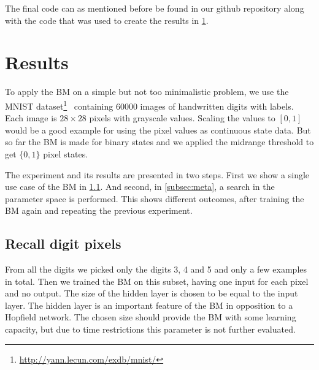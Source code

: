 \documentclass[12pt,twoside]{article}
\theoremstyle{plain}
\theoremstyle{definition}
\theoremstyle{remark}
\begin{document}
\noindent
The final code can as mentioned before be found in our github repository along
with the code that was used to create the results in \cref{sec:results}.


%
%
%
%
%
%
%


\section{Results}
\label{sec:results}

To apply the BM on a simple but not too minimalistic problem, we use the MNIST dataset\footnote{\url{http://yann.lecun.com/exdb/mnist/}}~\cite{MNIST} containing $60000$ images of handwritten digits with labels. Each image is $28 \times 28$ pixels with grayscale values. Scaling the values to $[0,1]$ would be a good example for using the pixel values as continuous state data. But so far the BM is made for binary states and we applied the midrange threshold to get $\{0, 1\}$ pixel states.

The experiment and its results are presented in two steps. First we show a single use case of the BM in \cref{subsec:recall}. And second, in \cref{subsec:meta}, a search in the parameter space is performed. This shows different outcomes, after training the BM again and repeating the previous experiment.


\subsection{Recall digit pixels}
\label{subsec:recall}

From all the digits we picked only the digits 3, 4 and 5 and only a few examples in total. Then we trained the BM on this subset, having one input for each pixel and no output.
The size of the hidden layer is chosen to be equal to the input layer. The hidden layer is an important feature of the BM in opposition to a Hopfield network. The chosen size should provide the BM with some learning capacity, but due to time restrictions this parameter is not further evaluated.
\end{document}
